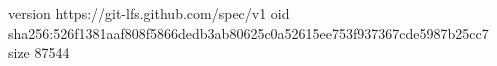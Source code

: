 version https://git-lfs.github.com/spec/v1
oid sha256:526f1381aaf808f5866dedb3ab80625c0a52615ee753f937367cde5987b25cc7
size 87544
